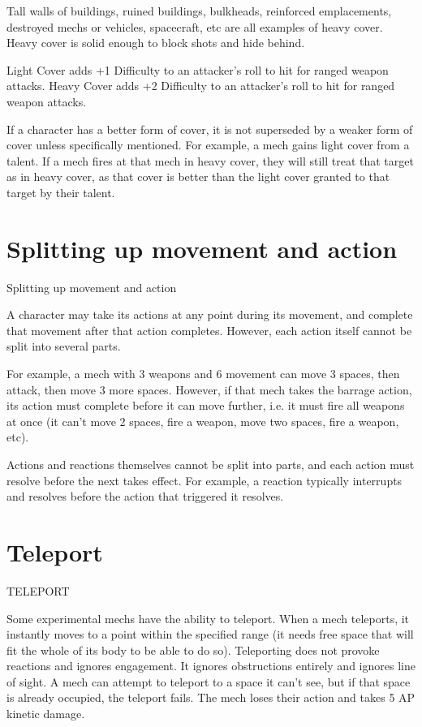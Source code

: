 Tall walls of buildings, ruined buildings, bulkheads, reinforced emplacements, destroyed mechs
or vehicles, spacecraft, etc are all examples of heavy cover. Heavy cover is solid enough to
block shots and hide behind.

Light Cover adds +1 Difficulty to an attacker’s roll to hit for ranged weapon attacks.
Heavy Cover adds +2 Difficulty to an attacker’s roll to hit for ranged weapon attacks.

If a character has a better form of cover, it is not superseded by a weaker form of cover unless
specifically mentioned. For example, a mech gains light cover from a talent. If a mech fires at that
mech in heavy cover, they will still treat that target as in heavy cover, as that cover is better than
the light cover granted to that target by their talent.

\section{Splitting up movement and action}
                              Splitting up movement and action

A character may take its actions at any point during its movement, and complete that movement
after that action completes. However, each action itself cannot be split into several parts.

For example, a mech with 3 weapons and 6 movement can move 3 spaces, then attack, then
move 3 more spaces. However, if that mech takes the barrage action, its action must complete
before it can move further, i.e. it must fire all weapons at once (it can’t move 2 spaces, fire a
weapon, move two spaces, fire a weapon, etc).

Actions and reactions themselves cannot be split into parts, and each action must resolve before
the next takes effect. For example, a reaction typically interrupts and resolves before the action
that triggered it resolves.

\section{Teleport}
                                                TELEPORT

Some experimental mechs have the ability to teleport. When a mech teleports, it instantly moves
to a point within the specified range (it needs free space that will fit the whole of its body to be
able to do so). Teleporting does not provoke reactions and ignores engagement. It ignores
obstructions entirely and ignores line of sight. A mech can attempt to teleport to a space it can’t
see, but if that space is already occupied, the teleport fails. The mech loses their action and takes
5 AP kinetic damage.

